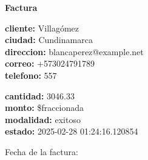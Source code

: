 \documentclass{article}
\begin{document}
\begin{center}
    {\LARGE \textbf{Factura}}\\[1cm]
\end{center}

\textbf{cliente:} Villagómez \\
\textbf{ciudad:} Cundinamarca \\
\textbf{direccion:} blancaperez@example.net \\
\textbf{correo:} +573024791789 \\
\textbf{telefono:} 557 \\

\vspace{0.5cm}

\textbf{cantidad:} 3046.33 \\
\textbf{monto:} \$fraccionada \\
\textbf{modalidad:} exitoso \\
\textbf{estado:} 2025-02-28 01:24:16.120854 \\

\vspace{1cm}

Fecha de la factura: 
\end{document}
